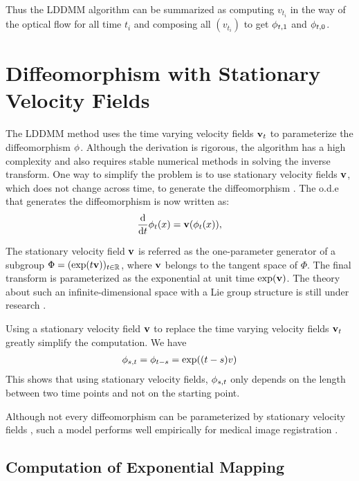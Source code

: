 \documentclass[letterpaper,12pt]{article}
\begin{document}
Thus the LDDMM algorithm can be summarized as computing $v_{t_i}$ in the way of the optical flow for all time $t_i$ and composing all $(v_{t_i})$ to get $\phi_{t, 1}$ and $\phi_{t, 0}$.



\section{Diffeomorphism with Stationary Velocity Fields}

The LDDMM method \cite{Beg2005Computing} uses the time varying
velocity fields $\mathbf{v}_t$ to parameterize the diffeomorphism
$\phi$. Although the derivation is rigorous, the algorithm has a high complexity and also requires stable numerical methods in solving the inverse transform. One way to simplify the problem is to use stationary velocity fields $\mathbf{v}$, which does not change across time, to generate the diffeomorphism \cite{Arsigny2006,Ashburner2007,Vercauteren2007,Vercauteren2008Symmetric,Hernandez2009}. The o.d.e that generates the diffeomorphism is now written as:
\begin{align}
\frac{\text{d}}{\text{d} t} \phi_t(x) = \mathbf{v}(\phi_t(x)), 
\end{align}

The stationary velocity field $\mathbf{v}$ is referred as the one-parameter generator of a subgroup $\Phi=(\exp(t\mathbf{v}))_{t \in \mathbb{R}}$, where $\mathbf{v}$ belongs to the tangent space of $\Phi$. The final transform is parameterized as the exponential at unit time $\exp(\mathbf{v})$. The theory about such an infinite-dimensional space with a Lie group structure is still under research \cite{Arsigny2006, Vercauteren2008Symmetric, Sternberg1964, Mahony2002}.  

Using a stationary velocity field $\mathbf{v}$ to replace the time varying velocity fields $\mathbf{v}_t$ greatly simplify the computation. We have
\begin{align}
\phi_{s,t} = \phi_{t-s} = \exp((t-s)v)
\end{align}
This shows that using stationary velocity fields, $\phi_{s,t}$ only depends on the length between two time points and not on the starting point. 

Although not every diffeomorphism can be parameterized by stationary velocity fields \cite{Ashburner2007}, such a model performs well empirically for medical image registration \cite{Hernandez2009, Vercauteren2009}.





\subsection{Computation of Exponential Mapping}
\end{document}

